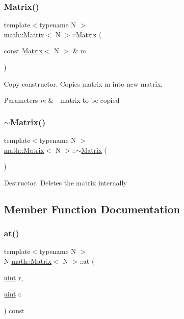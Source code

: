 \subsubsection{\texorpdfstring{Matrix()}{Matrix()}\hspace{0.1cm}{\footnotesize\ttfamily [7/7]}}
{\footnotesize\ttfamily template$<$typename N $>$ \\
\hyperlink{classmath_1_1Matrix}{math\+::\+Matrix}$<$ N $>$\+::\hyperlink{classmath_1_1Matrix}{Matrix} (\begin{DoxyParamCaption}\item[{const \hyperlink{classmath_1_1Matrix}{Matrix}$<$ N $>$ \&}]{m }\end{DoxyParamCaption})}

Copy constructor. Copies matrix m into new matrix. 
\begin{DoxyParams}{Parameters}
{\em m} & -\/ matrix to be copied \\
\hline
\end{DoxyParams}
\mbox{\label{classmath_1_1Matrix_afd52712eaef5a16115d605b7866a0576}} 
\subsubsection{\texorpdfstring{$\sim$\+Matrix()}{~Matrix()}}
{\footnotesize\ttfamily template$<$typename N $>$ \\
\hyperlink{classmath_1_1Matrix}{math\+::\+Matrix}$<$ N $>$\+::$\sim$\hyperlink{classmath_1_1Matrix}{Matrix} (\begin{DoxyParamCaption}{ }\end{DoxyParamCaption})}

Destructor. Deletes the matrix internally 

\subsection{Member Function Documentation}
\mbox{\label{classmath_1_1Matrix_aac510ef186a6bbf176d0ef4d79a7c666}} 
\subsubsection{\texorpdfstring{at()}{at()}}
{\footnotesize\ttfamily template$<$typename N $>$ \\
N \hyperlink{classmath_1_1Matrix}{math\+::\+Matrix}$<$ N $>$\+::at (\begin{DoxyParamCaption}\item[{\hyperlink{typedefs_8h_a7b9b9413622e67b9df7f2d090b48682b}{uint}}]{r,  }\item[{\hyperlink{typedefs_8h_a7b9b9413622e67b9df7f2d090b48682b}{uint}}]{c }\end{DoxyParamCaption}) const}

